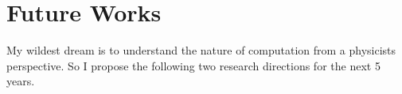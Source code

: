 \documentclass[a4paper]{article}
\newcommand{\<}{\langle}
\renewcommand{\>}{\rangle}
\begin{document}
\section{Future Works}

My wildest dream is to understand the nature of computation from a physicists perspective.
So I propose the following two research directions for the next 5 years.
\end{document}
